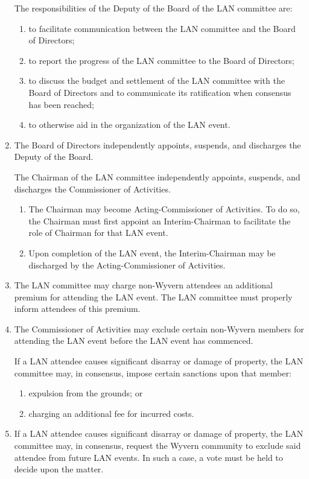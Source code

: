 \begin{enumerate}
    \begin{item}
        The responsibilities of the Deputy of the Board of the LAN committee are:
        \begin{enumerate}
            \item to facilitate communication between the LAN committee and the Board of Directors;
            \item to report the progress of the LAN committee to the Board of Directors;
            \item to discuss the budget and settlement of the LAN committee with the Board of Directors and to communicate its ratification when consensus has been reached;
            \item to otherwise aid in the organization of the LAN event.
        \end{enumerate}
    \end{item}

    \item The Board of Directors independently appoints, suspends, and discharges the Deputy of the Board.

    \begin{item}
        The Chairman of the LAN committee independently appoints, suspends, and discharges the Commissioner of Activities.
        \begin{enumerate}
            \item The Chairman may become Acting-Commissioner of Activities. To do so, the Chairman must first appoint an Interim-Chairman to facilitate the role of Chairman for that LAN event.
            \item Upon completion of the LAN event, the Interim-Chairman may be discharged by the Acting-Commissioner of Activities.
        \end{enumerate}
    \end{item}

    \item The LAN committee may charge non-Wyvern attendees an additional premium for attending the LAN event. The LAN committee must properly inform attendees of this premium.

    \item The Commissioner of Activities may exclude certain non-Wyvern members for attending the LAN event before the LAN event has commenced.
    
    \begin{item} If a LAN attendee causes significant disarray or damage of property, the LAN committee may, in consensus, impose certain sanctions upon that member:
        \begin{enumerate}
            \item expulsion from the grounds; or
            \item charging an additional fee for incurred costs.
        \end{enumerate}
    \end{item}
    
    \item If a LAN attendee causes significant disarray or damage of property, the LAN committee may, in consensus, request the Wyvern community to exclude said attendee from future LAN events. In such a case, a vote must be held to decide upon the matter.

\end{enumerate}
